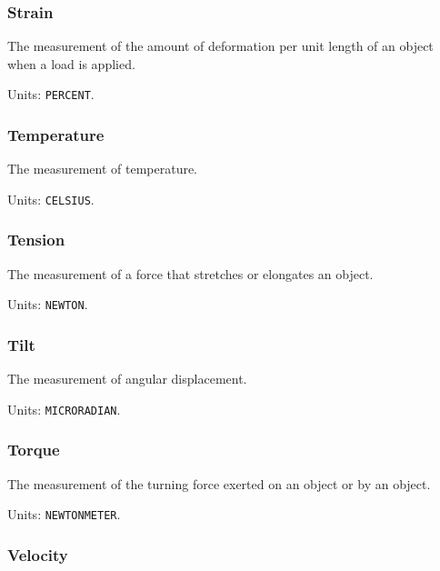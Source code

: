 \subsubsection{Strain}
\label{sec:Strain}



The measurement of the amount of deformation per unit length of an object when a load is applied.


Units: \texttt{PERCENT}.

\subsubsection{Temperature}
\label{sec:Temperature}



The measurement of temperature.


Units: \texttt{CELSIUS}.

\subsubsection{Tension}
\label{sec:Tension}



The measurement of a force that stretches or elongates an object.


Units: \texttt{NEWTON}.

\subsubsection{Tilt}
\label{sec:Tilt}



The measurement of angular displacement.


Units: \texttt{MICRO\textunderscore RADIAN}.

\subsubsection{Torque}
\label{sec:Torque}



The measurement of the turning force exerted on an object or by an object.


Units: \texttt{NEWTON\textunderscore METER}.

\subsubsection{Velocity}
\label{sec:Velocity}



